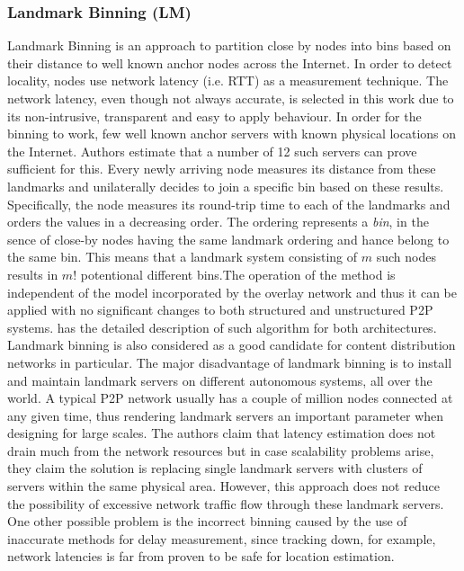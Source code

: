 \subsubsection{Landmark Binning (LM)}\label{sec:landmark_binning}

Landmark Binning \cite{RHMKS2002} is an approach to partition close
by nodes into bins based on their distance to well known anchor nodes across the
Internet.%
In order to detect
locality, nodes use network latency (i.e. RTT) as a measurement technique. The
network latency, even though not always accurate, is selected in this work due
to its non-intrusive, transparent and easy to apply behaviour. In order for the
binning to work, few well known anchor servers with known physical locations on
the Internet. Authors estimate that a number of 12 such servers can prove
sufficient for this. Every newly arriving node measures its distance from these
landmarks and unilaterally decides to join a specific bin based on these
results. Specifically, the node measures its round-trip time to each of the
landmarks and orders the values in a decreasing order. The ordering represents
a \emph{bin}, in the sence of close-by nodes having the same landmark ordering
and hance belong to the same bin. This means that a landmark system consisting
of $m$ such nodes results in $m!$ potentional different bins.The operation of
the method is independent of the model incorporated by the overlay network and
thus it can be applied with no significant changes to both structured and
unstructured P2P systems. \cite{RHMKS2002} has the detailed description of such
algorithm for both architectures. Landmark binning is also considered as a good
candidate for content distribution networks in particular. The major
disadvantage of landmark binning is to install and maintain landmark servers on
different autonomous systems, all over the world. A typical P2P network usually
has a couple of million nodes connected at any given time, thus rendering
landmark servers an important parameter when designing for large scales.  The
authors claim that latency estimation does not drain much from the network
resources but in case scalability problems arise, they claim the solution is
replacing single landmark servers with clusters of servers within the same
physical area. However, this approach does not reduce the possibility of
excessive network traffic flow through these landmark servers. One other
possible problem is the incorrect binning caused by the use of inaccurate
methods for delay measurement, since tracking down, for example, network
latencies is far from proven to be safe for location estimation.

